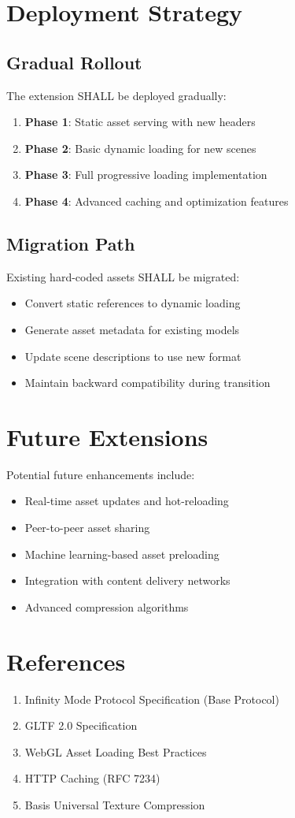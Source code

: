 \documentclass[12pt,a4paper]{article}
\begin{document}
\section{Deployment Strategy}

\subsection{Gradual Rollout}

The extension SHALL be deployed gradually:

\begin{enumerate}
\item \textbf{Phase 1}: Static asset serving with new headers
\item \textbf{Phase 2}: Basic dynamic loading for new scenes
\item \textbf{Phase 3}: Full progressive loading implementation
\item \textbf{Phase 4}: Advanced caching and optimization features
\end{enumerate}

\subsection{Migration Path}

Existing hard-coded assets SHALL be migrated:

\begin{itemize}
\item Convert static references to dynamic loading
\item Generate asset metadata for existing models
\item Update scene descriptions to use new format
\item Maintain backward compatibility during transition
\end{itemize}

\section{Future Extensions}

Potential future enhancements include:

\begin{itemize}
\item Real-time asset updates and hot-reloading
\item Peer-to-peer asset sharing
\item Machine learning-based asset preloading
\item Integration with content delivery networks
\item Advanced compression algorithms
\end{itemize}

\section{References}

\begin{enumerate}
\item Infinity Mode Protocol Specification (Base Protocol)
\item GLTF 2.0 Specification
\item WebGL Asset Loading Best Practices
\item HTTP Caching (RFC 7234)
\item Basis Universal Texture Compression
\end{enumerate}
\end{document}

